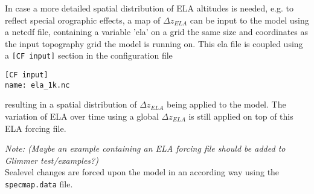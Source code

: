 In case a more detailed spatial distribution of ELA altitudes is needed, e.g. 
to reflect special orographic effects, a map of $\Delta z_{ELA}$ can be input
to the model using a netcdf file, containing a variable 'ela' on a grid
the same size and coordinates as the input topography grid the model is running
on. This ela file is coupled using a \texttt{[CF input]} section in the
configuration file
\begin{verbatim}
[CF input]
name: ela_1k.nc
\end{verbatim}
resulting in a spatial distribution of $\Delta z_{ELA}$ being applied to the
model. The variation of ELA over time using a global $\Delta z_{ELA}$ is still
applied on top of this ELA forcing file.

\textcolor[rgb]{1.00,0.00,0.00}{\emph{Note: (Maybe an example
containing an ELA forcing file should be added to Glimmer test/examples?)}}
\\
Sealevel changes are forced upon the model in an according way using the
\texttt{specmap.data} file.
